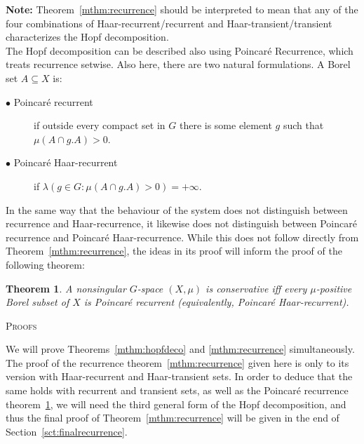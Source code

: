 \documentclass{amsart}
\numberwithin{equation}{subsection}
\newtheorem{mainthm}{Theorem}
\renewcommand{\themainthm}{\Alph{mainthm}}
\newcommand{\ssection}[1]{%
  \par
  \vspace{0.7\baselineskip}%
  {\normalfont\scshape\centering #1\par}%
  \vspace{0.5\baselineskip}%
}
\begin{document}
\begingroup
\footnotesize
\noindent \textbf{Note:} Theorem~\ref{mthm:recurrence} should be interpreted to mean that any of the four combinations of Haar-recurrent/recurrent and Haar-transient/transient characterizes the Hopf decomposition.
\endgroup\\

The Hopf decomposition can be described also using Poincar\'{e} Recurrence, which treats recurrence setwise. Also here, there are two natural formulations. A Borel set \(A\subseteq X\) is:
\begin{description}
    \item[\(\bullet\) Poincar\'{e} recurrent] if outside every compact set in \(G\) there is some element \(g\) such that \(\mu\left(A \cap g.A\right)>0\).
    \item[\(\bullet\) Poincar\'{e} Haar-recurrent] if \(\lambda\left(g\in G:\mu\left(A\cap g.A\right)>0\right)=+\infty\).
\end{description}

In the same way that the behaviour of the system does not distinguish between recurrence and Haar-recurrence, it likewise does not distinguish between Poincar\'{e} recurrence and Poincar\'{e} Haar-recurrence. While this does not follow directly from Theorem~\ref{mthm:recurrence}, the ideas in its proof will inform the proof of the following theorem:

\renewcommand{\themainthm}{B'}
\begin{mainthm}
\label{mthm:recurrencepoincare}
A nonsingular \(G\)-space \(\left(X,\mu\right)\) is conservative iff every \(\mu\)-positive Borel subset of \(X\) is Poincar\'{e} recurrent (equivalently, Poincar\'{e} Haar-recurrent).
\end{mainthm}
\renewcommand{\themainthm}{\Alph{mainthm}}

\ssection{Proofs}

We will prove Theorems~\ref{mthm:hopfdeco} and \ref{mthm:recurrence} simultaneously. The proof of the recurrence theorem~\ref{mthm:recurrence} given here is only to its version with Haar-recurrent and Haar-transient sets. In order to deduce that the same holds with recurrent and transient sets, as well as the Poincar\'{e} recurrence theorem~\ref{mthm:recurrencepoincare}, we will need the third general form of the Hopf decomposition, and thus the final proof of Theorem~\ref{mthm:recurrence} will be given in the end of Section~\ref{sct:finalrecurrence}.
\end{document}
